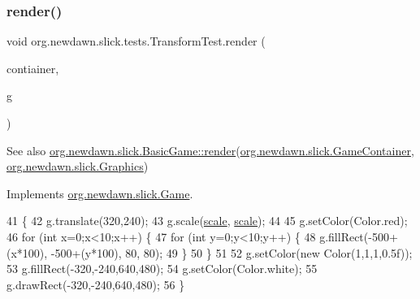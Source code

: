 \subsubsection{\texorpdfstring{render()}{render()}}
{\footnotesize\ttfamily void org.\+newdawn.\+slick.\+tests.\+Transform\+Test.\+render (\begin{DoxyParamCaption}\item[{\mbox{\hyperlink{classorg_1_1newdawn_1_1slick_1_1_game_container}{Game\+Container}}}]{contiainer,  }\item[{\mbox{\hyperlink{classorg_1_1newdawn_1_1slick_1_1_graphics}{Graphics}}}]{g }\end{DoxyParamCaption})\hspace{0.3cm}{\ttfamily [inline]}}

\begin{DoxySeeAlso}{See also}
\mbox{\hyperlink{interfaceorg_1_1newdawn_1_1slick_1_1_game_af1a4670d43eb3ba04dfcf55ab1975b64}{org.\+newdawn.\+slick.\+Basic\+Game\+::render}}(\mbox{\hyperlink{classorg_1_1newdawn_1_1slick_1_1_game_container}{org.\+newdawn.\+slick.\+Game\+Container}}, \mbox{\hyperlink{classorg_1_1newdawn_1_1slick_1_1_graphics}{org.\+newdawn.\+slick.\+Graphics}}) 
\end{DoxySeeAlso}


Implements \mbox{\hyperlink{interfaceorg_1_1newdawn_1_1slick_1_1_game_af1a4670d43eb3ba04dfcf55ab1975b64}{org.\+newdawn.\+slick.\+Game}}.


\begin{DoxyCode}
41                                                              \{
42         g.translate(320,240);
43         g.scale(\mbox{\hyperlink{classorg_1_1newdawn_1_1slick_1_1tests_1_1_transform_test_a3f9bd311b4aed7f2b69dac1f422e1547}{scale}}, \mbox{\hyperlink{classorg_1_1newdawn_1_1slick_1_1tests_1_1_transform_test_a3f9bd311b4aed7f2b69dac1f422e1547}{scale}});
44 
45         g.setColor(Color.red);
46         \textcolor{keywordflow}{for} (\textcolor{keywordtype}{int} x=0;x<10;x++) \{
47             \textcolor{keywordflow}{for} (\textcolor{keywordtype}{int} y=0;y<10;y++) \{
48                 g.fillRect(-500+(x*100), -500+(y*100), 80, 80);
49             \}
50         \}
51         
52         g.setColor(\textcolor{keyword}{new} Color(1,1,1,0.5f));
53         g.fillRect(-320,-240,640,480);
54         g.setColor(Color.white);
55         g.drawRect(-320,-240,640,480);
56     \}
\end{DoxyCode}
\mbox{\label{classorg_1_1newdawn_1_1slick_1_1tests_1_1_transform_test_a314f8f1c057599f9af7c8036b28a4c3e}} 
